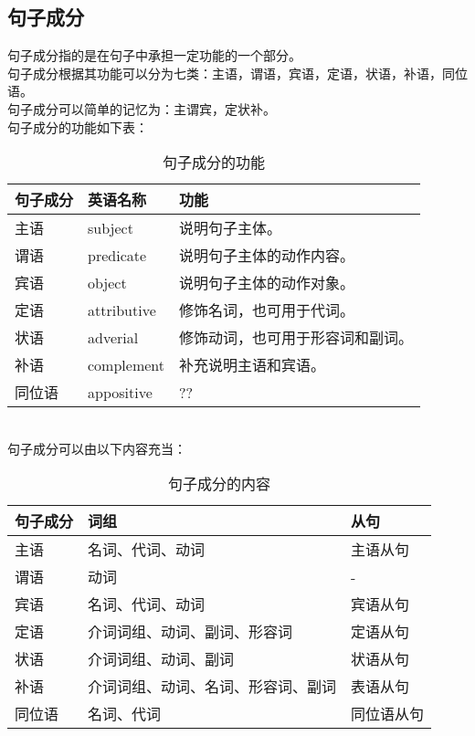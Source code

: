 \documentclass[UTF8]{ctexart}
\begin{document}
\subsection{句子成分}
    句子成分指的是在句子中承担一定功能的一个部分。\\[3mm]
    句子成分根据其功能可以分为七类：主语，谓语，宾语，定语，状语，补语，同位语。\\[3mm]
    句子成分可以简单的记忆为：主谓宾，定状补。\\[3mm]
    句子成分的功能如下表：\vspace{5pt}
    \begin{table}[h!]
        \begin{center}
            \ttfamily
            \begin{tabular}{p{60pt}|p{80pt}|p{190pt}}        
                \hline
                句子成分&英语名称&功能\\ \hline
                主语&subject&说明句子主体。\\ \hline
                谓语&predicate&说明句子主体的动作内容。\\ \hline
                宾语&object&说明句子主体的动作对象。\\ \hline
                定语&attributive&修饰名词，也可用于代词。\\ \hline
                状语&adverial&修饰动词，也可用于形容词和副词。\\ \hline
                补语&complement&补充说明主语和宾语。\\ \hline
                同位语&appositive&??\\ \hline
            \end{tabular}
            \rmfamily
            \caption{句子成分的功能}
        \end{center}
    \end{table}\\
    句子成分可以由以下内容充当：
    \begin{table}[h!]
        \begin{center}
            \ttfamily
            \begin{tabular}{p{60pt}|p{200pt}|p{70pt}}
                \hline
                句子成分&词组&从句\\ \hline
                主语&名词、代词、动词&主语从句\\ \hline
                谓语&动词&-\\ \hline
                宾语&名词、代词、动词&宾语从句\\ \hline
                定语&介词词组、动词、副词、形容词&定语从句\\ \hline
                状语&介词词组、动词、副词&状语从句\\ \hline
                补语&介词词组、动词、名词、形容词、副词&表语从句\\ \hline
                同位语&名词、代词&同位语从句\\ \hline
            \end{tabular}
            \rmfamily
            \caption{句子成分的内容}
        \end{center}
    \end{table}\\
\end{document}
